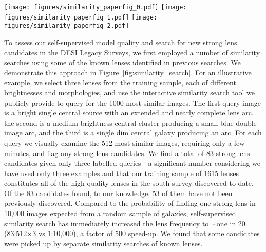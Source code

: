 \documentclass{aastex631}
\begin{document}
\begin{figure*}
    \centering
    \texttt{[image: figures/similarity\_paperfig\_0.pdf]}
    \texttt{[image: figures/similarity\_paperfig\_1.pdf]}
    \texttt{[image: figures/similarity\_paperfig\_2.pdf]}
    \caption{Similarity search for the discovery of new strong lens candidates, achieved without using a single label for training. We queried three images of previously discovered lenses (left), and on the right we display a sample of new strong lens candidates selected from the top 512 most similar images to each query, ordered by decreasing similarity score. Strong lens candidates with a red border are previously undiscovered. Using only three labelled data samples and $\sim$10 minutes of visual inspection we identified 83 strong lens candidates, 53 of them previously undiscovered.}
    \label{fig:similarity_search}
\end{figure*}

To assess our self-supervised model quality and search for new strong lens candidates in the DESI Legacy Surveys, we first employed a number of similarity searches using some of the known lenses identified in previous searches. We demonstrate this approach in Figure~\ref{fig:similarity_search}. For an illustrative example, we select three lenses from the training sample, each of different brightnesses and morphologies, and use the interactive similarity search tool we publicly provide to query for the 1000 most similar images. The first query image is a bright single central source with an extended and nearly complete lens arc, the second is a medium-brightness central cluster producing a small blue double-image arc, and the third is a single dim central galaxy producing an arc. For each query we visually examine the 512 most similar images, requiring only a few minutes, and flag any strong lens candidates. We find a total of 83 strong lens candidates given only three labelled queries - a significant number considering we have used only three examples and that our training sample of 1615 lenses constitutes all of the high-quality lenses in the south survey discovered to date. Of the 83 candidates found, to our knowledge, 53 of them have not been previously discovered. Compared to the probability of finding one strong lens in 10,000 images expected from a random sample of galaxies, self-supervised similarity search has immediately increased the lens frequency to $\sim$one in 20 (83:512$\times$3 vs 1:10,000), a factor of 500 speed-up. We found that some candidates were picked up by separate similarity searches of known lenses. 
\end{document}
